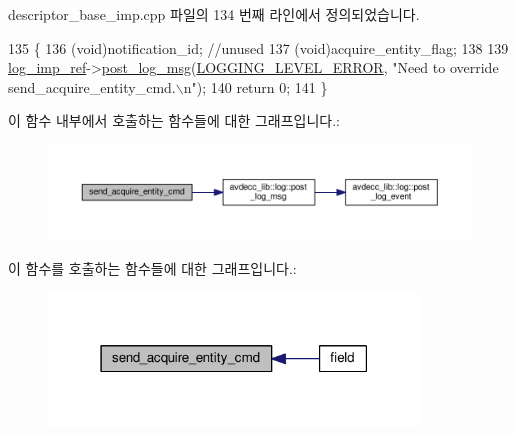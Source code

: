 descriptor\+\_\+base\+\_\+imp.\+cpp 파일의 134 번째 라인에서 정의되었습니다.


\begin{DoxyCode}
135 \{
136     (void)notification\_id; \textcolor{comment}{//unused}
137     (void)acquire\_entity\_flag;
138 
139     \hyperlink{namespaceavdecc__lib_acbe3e2a96ae6524943ca532c87a28529}{log\_imp\_ref}->\hyperlink{classavdecc__lib_1_1log_a68139a6297697e4ccebf36ccfd02e44a}{post\_log\_msg}(\hyperlink{namespaceavdecc__lib_a501055c431e6872ef46f252ad13f85cdaf2c4481208273451a6f5c7bb9770ec8a}{LOGGING\_LEVEL\_ERROR}, \textcolor{stringliteral}{"Need to
       override send\_acquire\_entity\_cmd.\(\backslash\)n"});
140     \textcolor{keywordflow}{return} 0;
141 \}
\end{DoxyCode}


이 함수 내부에서 호출하는 함수들에 대한 그래프입니다.\+:
\nopagebreak
\begin{figure}[H]
\begin{center}
\leavevmode
\includegraphics[width=350pt]{classavdecc__lib_1_1descriptor__base__imp_aea9e3053b75477816c15487d3e9a6f70_cgraph}
\end{center}
\end{figure}




이 함수를 호출하는 함수들에 대한 그래프입니다.\+:
\nopagebreak
\begin{figure}[H]
\begin{center}
\leavevmode
\includegraphics[width=279pt]{classavdecc__lib_1_1descriptor__base__imp_aea9e3053b75477816c15487d3e9a6f70_icgraph}
\end{center}
\end{figure}


